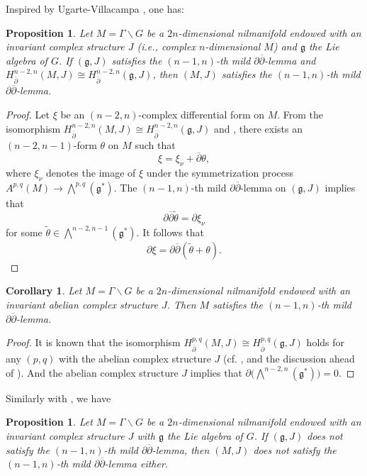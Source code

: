\documentclass[12pt]{amsart}
\numberwithin{equation}{section}
\newtheorem{proposition}[theorem]{Proposition}
\newtheorem{corollary}  [theorem]     {Corollary}
\renewcommand{\1}{\mathds{1}}
\newcommand{\db}{\overline{\partial}}
\renewcommand{\>}{\rightarrow}
\newcommand{\p}{\partial}
\def\p{\partial}
\begin{document}
Inspired by Ugarte-Villacampa \cite[Proposition 3.4 and Corollary
3.5]{UV}, one has:
\begin{proposition}\label{ms}
Let $M = \Gamma \backslash G$ be a $2n$-dimensional nilmanifold
endowed with an invariant complex structure $J$ (i.e., complex
$n$-dimensional $M$) and $\mathfrak{g}$ the Lie algebra of $G$. If
$(\mathfrak{g},J)$ satisfies the $(n-1,n)$-th mild $\p\db$-lemma and
$H^{n-2,n}_{\db}(M,J) \cong H^{n-2,n}_{\db}(\mathfrak{g},J)$, then
$(M,J)$ satisfies the $(n-1,n)$-th mild $\p\db$-lemma.
\end{proposition}

\begin{proof}
Let $\xi$ be an $(n-2,n)$-complex differential form on $M$. From the
isomorphism $H^{n-2,n}_{\db}(M,J) \cong
H^{n-2,n}_{\db}(\mathfrak{g},J)$ and \cite[Remark 3.3]{UV}, there
exists an $(n-2,n-1)$-form $\theta$ on $M$ such that
\[ \xi = \xi_{\nu} + \db \theta, \]
where $\xi_{\nu}$ denotes the image of $\xi$ under the
symmetrization process $A^{p,q}(M) \rightarrow
\bigwedge^{p,q}(\mathfrak{g^*})$. The $(n-1,n)$-th mild
$\p\db$-lemma on $(\mathfrak{g},J)$ implies that
\[ \p \db \tilde{\theta} = \p \xi_{\nu} \]
for some $\tilde{\theta} \in \bigwedge^{n-2,n-1}(\mathfrak{g^*})$.
It follows that
\[ \p \xi = \p \db (\tilde{\theta} + \theta). \]
\end{proof}

\begin{corollary}\label{abelian}
Let $M = \Gamma \backslash G$ be a $2n$-dimensional nilmanifold
endowed with an invariant abelian complex structure $J$. Then $M$
satisfies the $(n-1,n)$-th mild $\p\db$-lemma.
\end{corollary}

\begin{proof}
It is known that the isomorphism $H^{p,q}_{\db}(M,J) \cong
H^{p,q}_{\db}(\mathfrak{g},J)$ holds for any $(p,q)$ with the
abelian complex structure $J$ (cf. \cite[Remark 4]{CF},
\cite[Theorem 1.10]{R} and the discussion ahead of \cite[Remark
3.3]{UV}). And the abelian complex structure $J$ implies that $\p
\big( \bigwedge^{n-2,n}(\mathfrak{g}^*)\big)=0$.
\end{proof}

Similarly with \cite[Proposition 3.2]{UV}, we have
\begin{proposition}\label{notms}
Let $M = \Gamma \backslash G$ be a $2n$-dimensional nilmanifold
endowed with an invariant complex structure $J$ with $\mathfrak{g}$
the Lie algebra of $G$. If $(\mathfrak{g},J)$ does not satisfy the
$(n-1,n)$-th mild $\p\db$-lemma, then $(M,J)$ does not satisfy the
$(n-1,n)$-th mild $\p\db$-lemma either.
\end{proposition}
\end{document}
